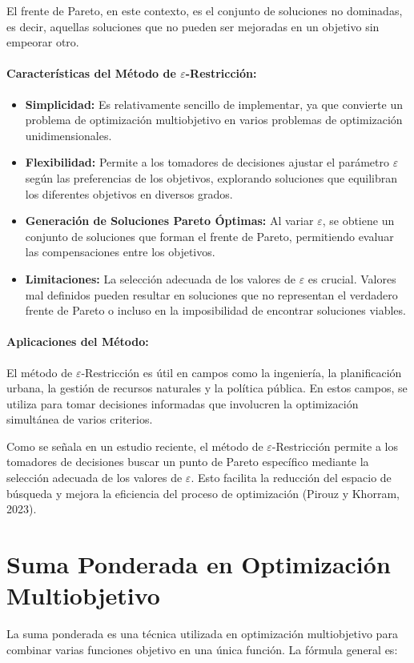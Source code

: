 \documentclass[12pt]{article}
\begin{document}
El frente de Pareto, en este contexto, es el conjunto de soluciones no dominadas, es decir, aquellas soluciones que no pueden ser mejoradas en un objetivo sin empeorar otro.

\paragraph{Características del Método de $\varepsilon$-Restricción:}
\begin{itemize}
    \item \textbf{Simplicidad:} Es relativamente sencillo de implementar, ya que convierte un problema de optimización multiobjetivo en varios problemas de optimización unidimensionales.
    \item \textbf{Flexibilidad:} Permite a los tomadores de decisiones ajustar el parámetro $\varepsilon$ según las preferencias de los objetivos, explorando soluciones que equilibran los diferentes objetivos en diversos grados.
    \item \textbf{Generación de Soluciones Pareto Óptimas:} Al variar $\varepsilon$, se obtiene un conjunto de soluciones que forman el frente de Pareto, permitiendo evaluar las compensaciones entre los objetivos.
    \item \textbf{Limitaciones:} La selección adecuada de los valores de $\varepsilon$ es crucial. Valores mal definidos pueden resultar en soluciones que no representan el verdadero frente de Pareto o incluso en la imposibilidad de encontrar soluciones viables.
\end{itemize}

\paragraph{Aplicaciones del Método:}
El método de $\varepsilon$-Restricción es útil en campos como la ingeniería, la planificación urbana, la gestión de recursos naturales y la política pública. En estos campos, se utiliza para tomar decisiones informadas que involucren la optimización simultánea de varios criterios.

Como se señala en un estudio reciente, el método de $\varepsilon$-Restricción permite a los tomadores de decisiones buscar un punto de Pareto específico mediante la selección adecuada de los valores de $\varepsilon$. Esto facilita la reducción del espacio de búsqueda y mejora la eficiencia del proceso de optimización (Pirouz y Khorram, 2023).
\section*{Suma Ponderada en Optimización Multiobjetivo}
La suma ponderada es una técnica utilizada en optimización multiobjetivo para combinar varias funciones objetivo en una única función. La fórmula general es:
\end{document}
